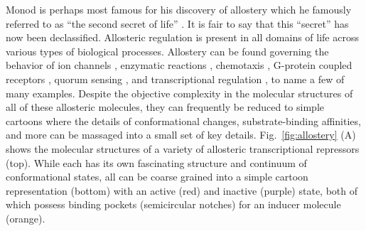 \documentclass[12pt]{caltech_thesis}
\begin{document}
Monod is perhaps most famous for his discovery of allostery which he
famously referred to as ``the second secret of life''
\autocite{ullmann2011,monod1965}. It is fair to say that this ``secret''
has now been declassified. Allosteric regulation is present in all
domains of life across various types of biological processes. Allostery
can be found governing the behavior of ion channels
\autocite{einav2017,auerbach2012}, enzymatic reactions
\autocite{einav2016}, chemotaxis \autocite{keymer2006}, G-protein
coupled receptors \autocite{canals2012}, quorum sensing
\autocite{swem2008}, and transcriptional regulation
\autocite{huang2018,lindsley2006a}, to name a few of many examples.
Despite the objective complexity in the molecular structures of all of
these allosteric molecules, they can frequently be reduced to simple
cartoons where the details of conformational changes, substrate-binding
affinities, and more can be massaged into a small set of key details.
Fig.~\ref{fig:allostery} (A) shows the molecular structures of a variety
of allosteric transcriptional repressors (top). While each has its own
fascinating structure and continuum of conformational states, all can be
coarse grained into a simple cartoon representation (bottom) with an
active (red) and inactive (purple) state, both of which possess binding
pockets (semicircular notches) for an inducer molecule (orange).
\end{document}
